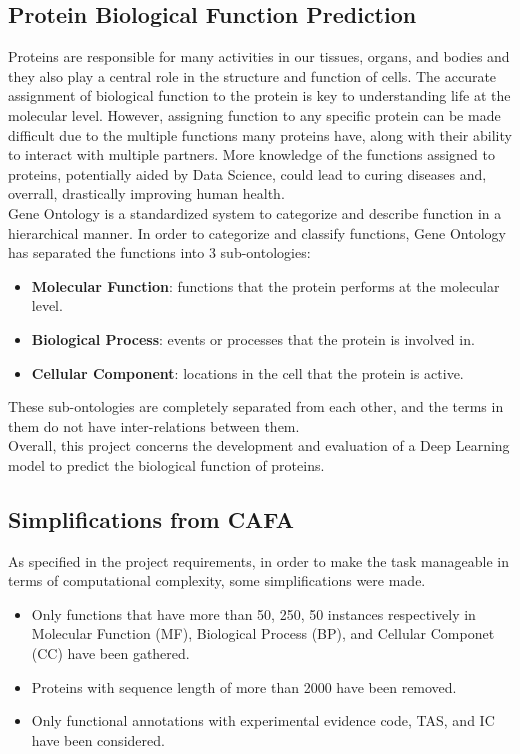\documentclass[10pt,twocolumn,letterpaper]{article}
\begin{document}
\subsection{Protein Biological Function Prediction}
Proteins are responsible for many activities in our tissues, organs, and bodies and they also play a central role in the structure and function of cells.
The accurate assignment of biological function to the protein is key to understanding life at the molecular level. However, assigning function to any 
specific protein can be made difficult due to the multiple functions many proteins have, along with their ability 
to interact with multiple partners. More knowledge of the functions assigned to proteins, potentially aided by Data Science, could 
lead to curing diseases and, overrall, drastically improving human health.\\

Gene Ontology is a standardized system to categorize and describe function in a hierarchical manner.
In order to categorize and classify functions, Gene Ontology has separated the functions into 3 sub-ontologies:
\begin{itemize}
\item {\bf Molecular Function}: functions that the protein performs at the molecular level.
\item {\bf Biological Process}: events or processes that the protein is involved in.
\item {\bf Cellular Component}: locations in the cell that the protein is active. 
\end{itemize}
These sub-ontologies are completely separated from each other, and the terms in them do not have inter-relations between them. \\

Overall, this project concerns the development and evaluation of a Deep Learning model to predict the biological function of proteins.



\subsection{Simplifications from CAFA}
As specified in the project requirements, in order to make the task manageable in terms of computational complexity, some simplifications were made.
\begin{itemize}
\item Only functions that have more than 50, 250, 50 instances respectively in Molecular Function (MF), Biological Process (BP), and Cellular Componet (CC) have been gathered. 
\item Proteins with sequence length of more than 2000 have been removed.
\item Only functional annotations with experimental evidence code, TAS, and IC have been considered.
\end{itemize}
\end{document}
